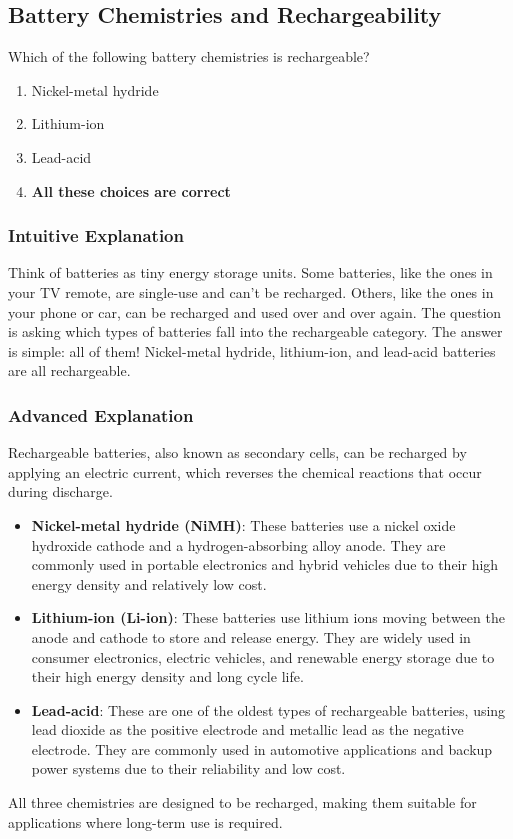 \subsection{Battery Chemistries and Rechargeability}
\label{T6A10}

\begin{tcolorbox}[colback=gray!10!white,colframe=black!75!black,title=T6A10]
Which of the following battery chemistries is rechargeable?
\begin{enumerate}[noitemsep]
    \item Nickel-metal hydride
    \item Lithium-ion
    \item Lead-acid
    \item \textbf{All these choices are correct}
\end{enumerate}
\end{tcolorbox}

\subsubsection*{Intuitive Explanation}
Think of batteries as tiny energy storage units. Some batteries, like the ones in your TV remote, are single-use and can't be recharged. Others, like the ones in your phone or car, can be recharged and used over and over again. The question is asking which types of batteries fall into the rechargeable category. The answer is simple: all of them! Nickel-metal hydride, lithium-ion, and lead-acid batteries are all rechargeable.

\subsubsection*{Advanced Explanation}
Rechargeable batteries, also known as secondary cells, can be recharged by applying an electric current, which reverses the chemical reactions that occur during discharge. 

\begin{itemize}
    \item \textbf{Nickel-metal hydride (NiMH)}: These batteries use a nickel oxide hydroxide cathode and a hydrogen-absorbing alloy anode. They are commonly used in portable electronics and hybrid vehicles due to their high energy density and relatively low cost.
    
    \item \textbf{Lithium-ion (Li-ion)}: These batteries use lithium ions moving between the anode and cathode to store and release energy. They are widely used in consumer electronics, electric vehicles, and renewable energy storage due to their high energy density and long cycle life.
    
    \item \textbf{Lead-acid}: These are one of the oldest types of rechargeable batteries, using lead dioxide as the positive electrode and metallic lead as the negative electrode. They are commonly used in automotive applications and backup power systems due to their reliability and low cost.
\end{itemize}

All three chemistries are designed to be recharged, making them suitable for applications where long-term use is required.